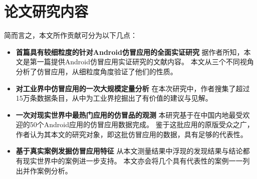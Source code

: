 \section{论文研究内容}
简而言之，本文所作贡献可分为以下几点：
\begin{itemize}
	\setlength{\itemsep}{1pt}
	\setlength{\parskip}{0pt}
	\setlength{\parsep}{0pt}

	\item{\bf 首篇具有较细粒度的针对Android仿冒应用的全面实证研究}
	据作者所知，本文是第一篇提供Android仿冒应用实证研究的文献内容。
	本文从三个不同视角分析了仿冒应用，从细粒度角度验证了他们的性质。

	\item{\bf 对工业界中仿冒应用的一次大规模定量分析}
	在本次研究中，作者搜集了超过15万条数据条目，从中为工业界挖掘出了有价值的建议与见解。

	\item {\bf 一次对现实世界中最热门应用的仿冒品的观测}
	本研究基于在中国内地最受欢迎的50个Android应用的仿冒应用数据完成。
	鉴于这批应用的原版受众之广，作者认为其本文的研究对象，即这批仿冒应用的数据，具有足够的代表性。

	\item {\bf 基于真实案例发掘仿冒应用特征}
	从本文测量结果中浮现的发现结果与结论都有现实世界中的案例进一步支持。
	本文亦会将几个具有代表性的案例一一列出并作案例分析。


\end{itemize}


